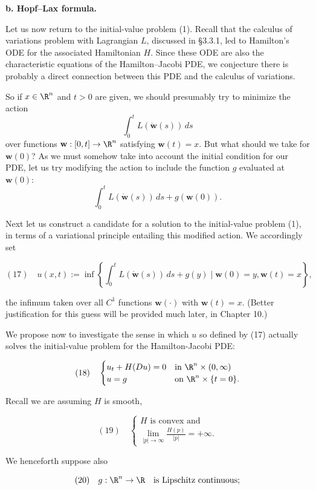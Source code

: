 \textbf{b. Hopf--Lax formula.}

Let us now return to the initial-value problem (1). Recall that the calculus of variations problem with Lagrangian $L$, discussed in \S 3.3.1, led to Hamilton's ODE for the associated Hamiltonian $H$. Since these ODE are also the characteristic equations of the Hamilton--Jacobi PDE, we conjecture there is probably a direct connection between this PDE and the calculus of variations.

So if $x \in \R^n$ and $t > 0$ are given, we should presumably try to minimize the action
$$\int_0^t L(\dot{\mathbf{w}}(s))\,ds$$
over functions $\mathbf{w} : [0,t] \to \R^n$ satisfying $\mathbf{w}(t) = x$. But what should we take for $\mathbf{w}(0)$? As we must somehow take into account the initial condition for our PDE, let us try modifying the action to include the function $g$ evaluated at $\mathbf{w}(0)$:
$$\int_0^t L(\dot{\mathbf{w}}(s))\,ds + g(\mathbf{w}(0)).$$

Next let us construct a candidate for a solution to the initial-value problem (1), in terms of a variational principle entailing this modified action. We accordingly set

$$(17) \quad u(x,t) := \inf \left\{ \int_0^t L(\dot{\mathbf{w}}(s)) \, ds + g(y) \mid \mathbf{w}(0) = y, \mathbf{w}(t) = x \right\},$$

the infimum taken over all $C^1$ functions $\mathbf{w}(\cdot)$ with $\mathbf{w}(t) = x$. (Better justification for this guess will be provided much later, in Chapter 10.)

We propose now to investigate the sense in which $u$ so defined by (17) actually solves the initial-value problem for the Hamilton-Jacobi PDE:

$$(18) \quad \begin{cases} u_t + H(Du) = 0 & \text{in } \R^n \times (0,\infty) \\ u = g & \text{on } \R^n \times \{t = 0\}. \end{cases}$$

Recall we are assuming $H$ is smooth,

$$(19) \quad \begin{cases} H \text{ is convex and} \\ \lim_{|p| \to \infty} \frac{H(p)}{|p|} = +\infty. \end{cases}$$

We henceforth suppose also

$$(20) \quad g : \R^n \to \R \quad \text{is Lipschitz continuous;}$$

